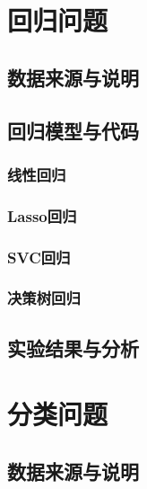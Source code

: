 \documentclass{ds201}
\begin{document}

\makecover

\tableofcontents

\newpage


\section{回归问题}


\subsection{数据来源与说明}


\subsection{回归模型与代码}


\subsubsection{线性回归}

\subsubsection{Lasso回归}

\subsubsection{SVC回归}

\subsubsection{决策树回归}

\subsection{实验结果与分析}

\section{分类问题}

\subsection{数据来源与说明}
\end{document}
